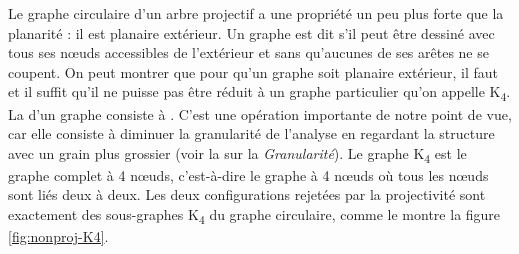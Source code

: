 {    Le graphe circulaire d’un arbre projectif a une propriété un peu plus forte que la planarité : il est planaire extérieur.
     {Un graphe est dit  s’il peut être dessiné avec tous ses nœuds accessibles de l’extérieur et sans qu’aucunes de ses arêtes ne se coupent.}
   On peut montrer que pour qu’un graphe soit planaire extérieur, il faut et il suffit qu’il ne puisse pas être réduit à un graphe particulier qu’on appelle K\textsubscript{4}. La  d’un graphe consiste à . C’est une opération importante de notre point de vue, car elle consiste à diminuer la granularité de l'analyse en regardant la structure avec un grain plus grossier (voir la  sur la \textit{Granularité}). Le graphe K\textsubscript{4} est le graphe complet à 4 nœuds, c’est-à-dire le graphe à 4 nœuds où tous les nœuds sont liés deux à deux. Les deux configurations rejetées par la projectivité sont exactement des sous-graphes K\textsubscript{4} du graphe circulaire, comme le montre la figure \ref{fig:nonproj-K4}.
   
}
